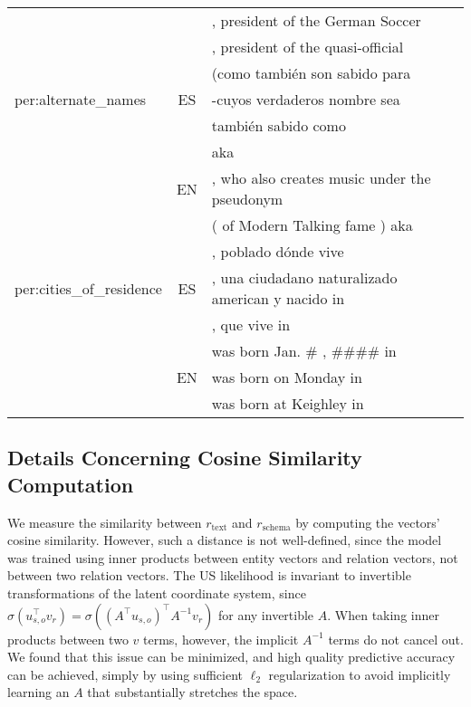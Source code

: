 \begin{table}[h]
\begin{center}
\begin{tabular}{|l|c|p{8.5cm}|}
   &						&  	\argTwo, president of the German Soccer \argOne 	\\%
   &						&  	\argTwo, president of the quasi-official \argOne 	\\
\hline\hline
%
 \multirow{3}{*}{per:alternate\_names} &
   \multirow{3}{*}{ES} 	& 	\argOne(como tambi\'{e}n son sabido para \argTwo 			\\%
   &					&  	\argTwo-cuyos verdaderos nombre sea \argOne 	\\%
   &					&  	\argOne  tambi\'{e}n sabido como \argTwo 	\\
\cline{2-3}
&   \multirow{3}{*}{EN} 	& 	\argOne aka \argTwo 		\\%
   &						&  	\argOne, who also creates music under the pseudonym \argTwo 	\\%
   &						&  	\argOne( of Modern Talking fame ) aka \argTwo  	\\
\hline\hline
%
 \multirow{3}{*}{per:cities\_of\_residence} &
   \multirow{3}{*}{ES} 	& 	\argOne, poblado d\'{o}nde vive \argTwo 			\\%
   &					&  	\argOne, una ciudadano naturalizado american y nacido in \argTwo 	\\%
   &					&  	\argOne, que vive in \argTwo 	\\
\cline{2-3}
&   \multirow{3}{*}{EN} 	& 	\argOne was born Jan. \# , \#\#\#\# in \argTwo 		\\%
   &						&  	\argOne was born on Monday in \argTwo 	\\%
   &						&  	\argOne was born at Keighley in \argTwo 	\\
\hline
\end{tabular}
\end{center}
\end{table}

\subsection{Details Concerning Cosine Similarity Computation}
\label{app:cosine}
We measure the similarity between $r_{\text{text}}$ and $r_{\text{schema}}$ by computing the vectors' cosine similarity. However, such a distance is not well-defined, since the model was trained using inner products between entity vectors and relation vectors, not between two relation vectors. The US likelihood is invariant to invertible transformations of the latent coordinate system, since $\sigma\left( u_{s,o}^\top v_r \right) = \sigma\left( (A^\top u_{s,o})^\top A^{-1} v_r \right)$ for any invertible $A$. When taking inner products between two $v$ terms, however, the implicit $A^{-1}$ terms do not cancel out. We found that this issue can be minimized, and high quality predictive accuracy can be achieved, simply by using sufficient $\ell_2$ regularization to avoid implicitly learning an $A$ that substantially stretches the space.

